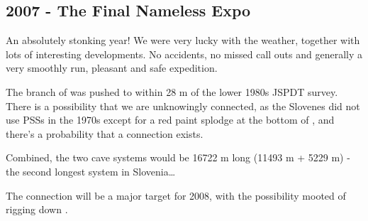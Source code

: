 \begin{tcolorbox}
\chapter{2007 - The Final Nameless Expo}
An absolutely stonking year! We were very lucky with the weather, together with lots of interesting developments. No accidents, no missed call outs and generally a very smoothly run, pleasant and safe expedition.

The  branch of  was pushed to within 28 m of the lower  1980s JSPDT survey. There is a possibility that we are unknowingly connected, as the Slovenes did not use PSSs in the 1970s except for a red paint splodge at the bottom of , and there's a probability that a connection exists.

Combined, the two cave systems would be 16722 m long (11493 m + 5229 m) - the second longest system in Slovenia\ldots{}

The connection will be a major target for 2008, with the possibility mooted of rigging down .



\end{tcolorbox}
\BgThispage
